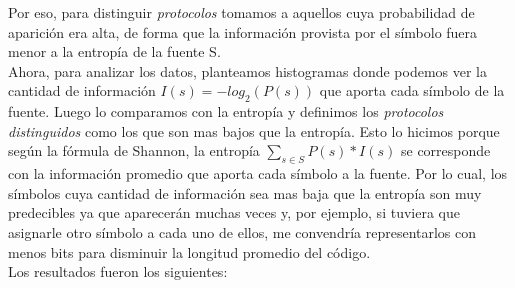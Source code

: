 Por eso, para distinguir \emph{protocolos} tomamos a
aquellos cuya probabilidad de aparición era alta, de forma que la información provista por el símbolo fuera menor a la entropía de la fuente S.\\

Ahora, para analizar los datos, planteamos histogramas donde podemos ver la cantidad de información $I(s) = -log_2(P(s))$ que aporta cada símbolo de la fuente. Luego lo comparamos con la entropía y definimos los \emph{protocolos distinguidos} como los que son mas bajos que la entropía. Esto lo hicimos porque según la fórmula de Shannon, la entropía $\sum\limits_{s \in S} P(s) * I(s)$ se corresponde con la información promedio que aporta cada símbolo a la fuente. Por lo cual, los símbolos cuya cantidad de información sea mas baja que la entropía son muy predecibles ya que aparecerán muchas veces y, por ejemplo, si tuviera que asignarle otro símbolo a cada uno de ellos, me convendría representarlos con menos bits para disminuir la longitud promedio del código. \\

Los resultados fueron los siguientes: \\


 \\

